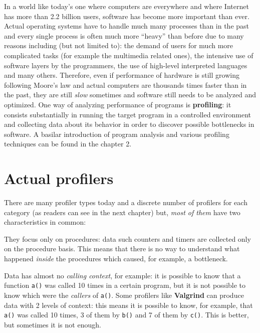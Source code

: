 \documentclass[a4paper,10pt]{report}
\begin{document}
In a world like today's one where computers are everywhere and where
\mbox{Internet} has more than 2.2 billion users, software has become more
important than ever. Actual operating systems have to handle much many
processes than in the past and every single process is often much more ``heavy''
than before due to many reasons including (but not limited to): the
demand of users for much more complicated tasks (for example the multimedia
related ones), the intensive use of software layers by the programmers, the use
of high-level interpreted languages and many others. Therefore, even if performance
of hardware is still growing following Moore's law and actual computers are
thousands times faster than in the past, they are still \emph{slow} sometimes and
software still needs to be analyzed and optimized. One way of analyzing
performance of programs is \textbf{profiling}: it consists substantially in
running the target program in a controlled environment and collecting data about
its behavior in order to discover possible bottlenecks in software. A basilar
introduction of program analysis and various profiling techniques can be found
in the chapter 2.

\section{Actual profilers}

There are many profiler types today and a discrete number of profilers for
each category (as readers can see in the next chapter) but, \emph{most of them}
have two characteristics in common:

\begin{itemize*}

\item They focus only on procedures: data such counters and timers are collected
only on the procedure basis. This means that there is no way to understand what
happened \emph{inside} the procedures which caused, for example, a bottleneck.

\item Data has almost no \emph{calling context}, for example: it is possible to know that
a function \verb|a()| was called 10 times in a certain program, but it is not possible to know which were the \emph{callers} of \verb|a()|. Some profilers like \textbf{Valgrind} can
produce data with 2 levels of context: this means it is possible to know, for
example, that \verb|a()| was called 10 times, 3 of them by \verb|b()| and 7 of them by  \verb|c()|. This is better, but sometimes
it is not enough.

\end{itemize*}
\end{document}

